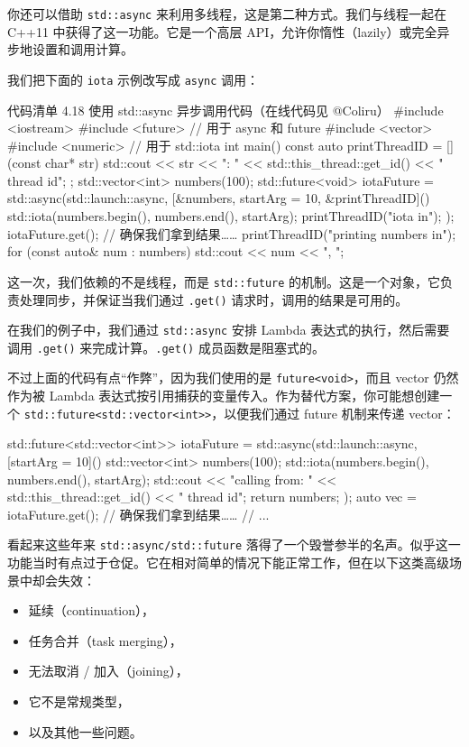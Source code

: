 你还可以借助 \texttt{std::async} 来利用多线程，这是第二种方式。我们与线程一起在 C++11 中获得了这一功能。它是一个高层 API，允许你惰性（lazily）或完全异步地设置和调用计算。

我们把下面的 \texttt{iota} 示例改写成 \texttt{async} 调用：

\begin{codeboxt}{代码清单 4.18 使用 std::async 异步调用代码（在线代码见 @Coliru）}
#include <iostream>
#include <future>
// 用于 async 和 future
#include <vector>
#include <numeric> // 用于 std::iota
int main() {
const auto printThreadID = [](const char* str) {
std::cout << str << ": "
<< std::this_thread::get_id() << " thread id\n";
};
std::vector<int> numbers(100);
std::future<void> iotaFuture = std::async(std::launch::async,
[&numbers, startArg = 10, &printThreadID]() {
std::iota(numbers.begin(), numbers.end(), startArg);
printThreadID("iota in");
}
);
iotaFuture.get(); // 确保我们拿到结果……
printThreadID("printing numbers in");
for (const auto& num : numbers)
std::cout << num << ", ";
}
\end{codeboxt}

这一次，我们依赖的不是线程，而是 \texttt{std::future} 的机制。这是一个对象，它负责处理同步，并保证当我们通过 \texttt{.get()} 请求时，调用的结果是可用的。

在我们的例子中，我们通过 \texttt{std::async} 安排 Lambda 表达式的执行，然后需要调用 \texttt{.get()} 来完成计算。\texttt{.get()} 成员函数是阻塞式的。

不过上面的代码有点“作弊”，因为我们使用的是 \texttt{future<void>}，而且 vector 仍然作为被 Lambda 表达式按引用捕获的变量传入。作为替代方案，你可能想创建一个 \texttt{std::future<std::vector<int>>}，以便我们通过 future 机制来传递 vector：

\begin{codebox}
std::future<std::vector<int>> iotaFuture = std::async(std::launch::async,
[startArg = 10]() {
std::vector<int> numbers(100);
std::iota(numbers.begin(), numbers.end(), startArg);
std::cout << "calling from: "
<< std::this_thread::get_id() << " thread id\n";
return numbers;
}
);
auto vec = iotaFuture.get(); // 确保我们拿到结果……
// ...
\end{codebox}

看起来这些年来 \texttt{std::async/std::future} 落得了一个毁誉参半的名声。似乎这一功能当时有点过于仓促。它在相对简单的情况下能正常工作，但在以下这类高级场景中却会失效：

\begin{itemize}
\item 延续（continuation），
\item 任务合并（task merging），
\item 无法取消 / 加入（joining），
\item 它不是常规类型，
\item 以及其他一些问题。
\end{itemize}

